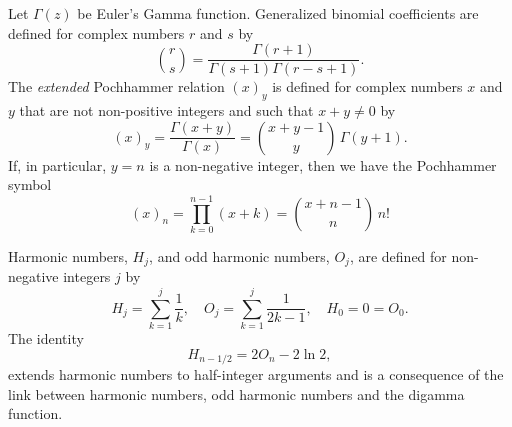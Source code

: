 \documentclass[12pt,reqno]{article}
\begin{document}
Let $\Gamma(z)$ be Euler's Gamma function. Generalized binomial coefficients are defined for complex numbers $r$ and $s$ by
\begin{equation}\label{y89d722}
\binom rs= \frac{{\Gamma (r + 1)}}{{\Gamma (s + 1)\Gamma (r - s + 1)}}.
\end{equation}
The {\it extended} Pochhammer relation $(x)_y$ is defined for complex numbers $x$ and $y$ that are not non-positive integers and such that $x+y\ne0$ by
\begin{equation}\label{ex_pochhammer}
\left( x \right)_y  = \frac{{\Gamma \left( {x + y} \right)}}{{\Gamma \left( x \right)}} = \binom{{x + y - 1}}{y}\,\Gamma \left( {y + 1} \right).
\end{equation}
If, in particular,  $y=n$ is a non-negative integer, then we have the Pochhammer symbol
\begin{equation}
\left( x \right)_n  = \prod_{k = 0}^{n - 1} {\left(x + k\right)}  = \binom{{x + n - 1}}{n}\,n!
\end{equation}

Harmonic numbers, $H_j$, and odd harmonic numbers, $O_j$, are defined for non-negative integers $j$ by
\begin{equation}
H_j=\sum_{k=1}^j\frac1k,\quad O_j=\sum_{k=1}^j\frac1{2k-1},\quad H_0=0=O_0.
\end{equation}
The identity
\begin{equation}\label{nerd5x1}
H_{n-1/2}=2O_n-2\ln 2,
\end{equation}
extends harmonic numbers to half-integer arguments and is a consequence of the link between harmonic numbers, odd harmonic numbers and the digamma function.
\end{document}

